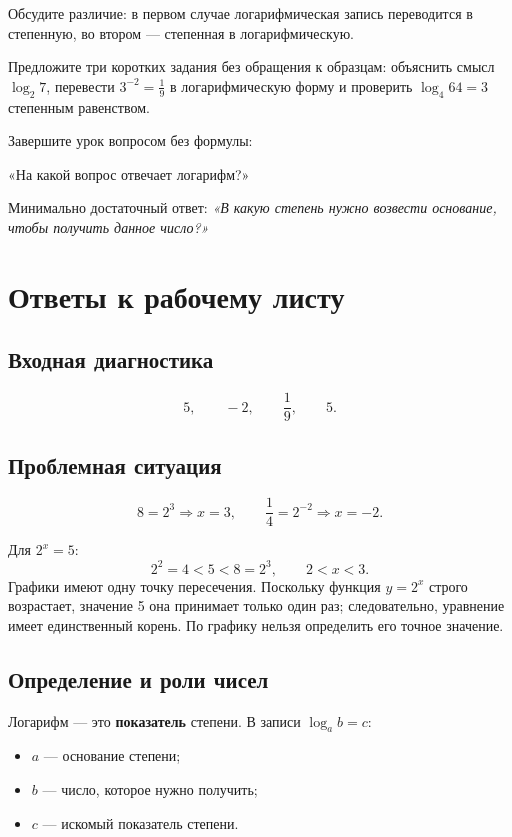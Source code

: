 Обсудите различие: в первом случае логарифмическая запись переводится в
степенную, во втором --- степенная в логарифмическую.


Предложите три коротких задания без обращения к образцам: объяснить смысл
\(\log_2 7\), перевести \(3^{-2}=\frac19\) в логарифмическую форму и
проверить \(\log_4 64=3\) степенным равенством.

Завершите урок вопросом без формулы:

\begin{center}
  «На какой вопрос отвечает логарифм?»
\end{center}

Минимально достаточный ответ:
\textit{«В какую степень нужно возвести основание, чтобы получить данное
число?»}

\section{Ответы к рабочему листу}

\subsection{Входная диагностика}

\[
  5,\qquad -2,\qquad \frac19,\qquad 5.
\]

\subsection{Проблемная ситуация}

\[
  8=2^3\Rightarrow x=3,
  \qquad
  \frac14=2^{-2}\Rightarrow x=-2.
\]

Для \(2^x=5\):
\[
  2^2=4<5<8=2^3,
  \qquad 2<x<3.
\]
Графики имеют одну точку пересечения. Поскольку функция \(y=2^x\) строго
возрастает, значение 5 она принимает только один раз; следовательно,
уравнение имеет единственный корень. По графику нельзя определить его
точное значение.

\subsection{Определение и роли чисел}

Логарифм --- это \textbf{показатель} степени. В записи
\(\log_a b=c\):
\begin{itemize}
  \item \(a\) --- основание степени;
  \item \(b\) --- число, которое нужно получить;
  \item \(c\) --- искомый показатель степени.
\end{itemize}

